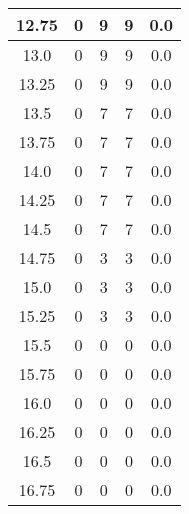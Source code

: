 \documentclass[letterpaper, 12pt]{article}
\begin{document}
\begin{longtable}{|c|c|c|c|c|}
\hline
12.75 & 0 & 9 & 9 & 0.0 \\
\hline
13.0 & 0 & 9 & 9 & 0.0 \\
\hline
13.25 & 0 & 9 & 9 & 0.0 \\
\hline
13.5 & 0 & 7 & 7 & 0.0 \\
\hline
13.75 & 0 & 7 & 7 & 0.0 \\
\hline
14.0 & 0 & 7 & 7 & 0.0 \\
\hline
14.25 & 0 & 7 & 7 & 0.0 \\
\hline
14.5 & 0 & 7 & 7 & 0.0 \\
\hline
14.75 & 0 & 3 & 3 & 0.0 \\
\hline
15.0 & 0 & 3 & 3 & 0.0 \\
\hline
15.25 & 0 & 3 & 3 & 0.0 \\
\hline
15.5 & 0 & 0 & 0 & 0.0 \\
\hline
15.75 & 0 & 0 & 0 & 0.0 \\
\hline
16.0 & 0 & 0 & 0 & 0.0 \\
\hline
16.25 & 0 & 0 & 0 & 0.0 \\
\hline
16.5 & 0 & 0 & 0 & 0.0 \\
\hline
16.75 & 0 & 0 & 0 & 0.0 \\
\hline
\end{longtable}
\end{document}
